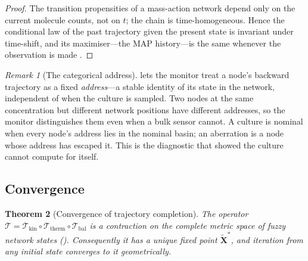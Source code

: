 \documentclass[11pt,twocolumn,a4paper]{article}
\theoremstyle{thmstyle}
\newtheorem{theorem}{Theorem}[section]
\theoremstyle{definition}
\theoremstyle{remark}
\newtheorem{remark}[theorem]{Remark}
\begin{document}
\begin{proof}
The transition propensities of a mass-action network depend only on the
current molecule counts, not on $t$; the chain is time-homogeneous. Hence
the conditional law of the past trajectory given the present state is
invariant under time-shift, and its maximiser---the MAP history---is the
same whenever the observation is made
\citep{gillespie1977exact,vankampen2007stochastic,viterbi1967error}.
\end{proof}

\begin{remark}[The categorical address]
\label{rem:address}
 lets the monitor treat a node's backward trajectory as
a fixed \emph{address}---a stable identity of its state in the network,
independent of when the culture is sampled. Two nodes at the same
concentration but different network positions have different addresses, so
the monitor distinguishes them even when a bulk sensor cannot. A culture is
nominal when every node's address lies in the nominal basin; an aberration
is a node whose address has escaped it. This is the diagnostic that
 showed the culture cannot compute for itself.
\end{remark}

\subsection{Convergence}

\begin{theorem}[Convergence of trajectory completion]
\label{thm:convergence}
The operator $\mathcal{T}=\mathcal{T}_{\mathrm{kin}}\circ
\mathcal{T}_{\mathrm{therm}}\circ\mathcal{T}_{\mathrm{bal}}$ is a
contraction on the complete metric space of fuzzy network states
(). Consequently it has a unique fixed point
$\widetilde{\mathbf{X}}^\ast$, and iteration from any initial state
converges to it geometrically.
\end{theorem}
\end{document}
